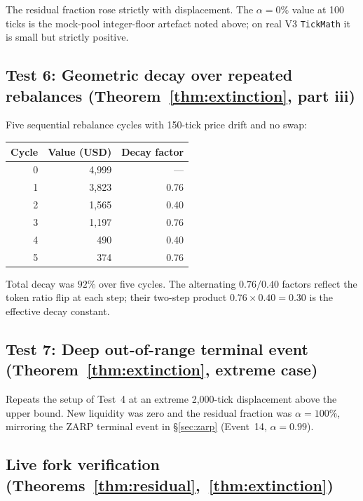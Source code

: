 \documentclass{manuscript}
\begin{document}
\noindent The residual fraction rose strictly with displacement. The $\alpha = 0\%$ value at 100 ticks is the mock-pool integer-floor artefact noted above; on real V3 \texttt{TickMath} it is small but strictly positive.

\subsection{Test 6: Geometric decay over repeated rebalances (Theorem~\ref{thm:extinction}, part iii)}\label{sec:foundry-decay}

Five sequential rebalance cycles with 150-tick price drift and no swap:

\begin{table}[H]
\centering
\begin{tabular}{@{}rrr@{}}
\toprule
Cycle & Value (USD) & Decay factor \\
\midrule
0 & 4{,}999 & --- \\
1 & 3{,}823 & 0.76 \\
2 & 1{,}565 & 0.40 \\
3 & 1{,}197 & 0.76 \\
4 & 490     & 0.40 \\
5 & 374     & 0.76 \\
\bottomrule
\end{tabular}
\end{table}

\noindent Total decay was $92\%$ over five cycles. The alternating $0.76 / 0.40$ factors reflect the token ratio flip at each step; their two-step product $0.76 \times 0.40 = 0.30$ is the effective decay constant.

\subsection{Test 7: Deep out-of-range terminal event (Theorem~\ref{thm:extinction}, extreme case)}\label{sec:foundry-terminal}

Repeats the setup of Test~4 at an extreme 2{,}000-tick displacement above the upper bound. New liquidity was zero and the residual fraction was $\alpha = 100\%$, mirroring the ZARP terminal event in \S\ref{sec:zarp} (Event~14, $\alpha = 0.99$).

\subsection{Live fork verification (Theorems~\ref{thm:residual},~\ref{thm:extinction})}\label{sec:foundry-fork}
\end{document}
